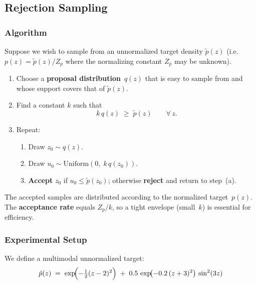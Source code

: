 \documentclass[12pt, a4paper]{article}
\begin{document}
\subsection{Rejection Sampling}
\label{sec:rejection}

\subsubsection{Algorithm}

Suppose we wish to sample from an unnormalized target density
$\tilde{p}(z)$ (i.e.\ $p(z) = \tilde{p}(z)/Z_p$ where the
normalizing constant $Z_p$ may be unknown).

\begin{enumerate}
    \item Choose a \textbf{proposal distribution}~$q(z)$ that is easy
          to sample from and whose support covers that of
          $\tilde{p}(z)$.
    \item Find a constant $k$ such that
          \begin{equation}
              k\,q(z) \;\geq\; \tilde{p}(z) \qquad \forall\, z.
              \label{eq:envelope}
          \end{equation}
    \item Repeat:
          \begin{enumerate}
              \item Draw $z_0 \sim q(z)$.
              \item Draw $u_0 \sim \mathrm{Uniform}(0,\; k\,q(z_0))$.
              \item \textbf{Accept} $z_0$ if $u_0 \leq \tilde{p}(z_0)$;
                    otherwise \textbf{reject} and return to step~(a).
          \end{enumerate}
\end{enumerate}

The accepted samples are distributed according to the normalized
target~$p(z)$.  The \textbf{acceptance rate} equals
$Z_p / k$, so a tight envelope (small~$k$) is essential for
efficiency.

\subsubsection{Experimental Setup}

We define a multimodal unnormalized target:
\begin{equation}
    \tilde{p}(z) \;=\;
        \exp\!\Bigl(-\tfrac{1}{2}(z-2)^2\Bigr)
        \;+\;
        0.5\,\exp\!\bigl(-0.2\,(z+3)^2\bigr)\,\sin^2(3z)
    \label{eq:target}
\end{equation}
\end{document}
